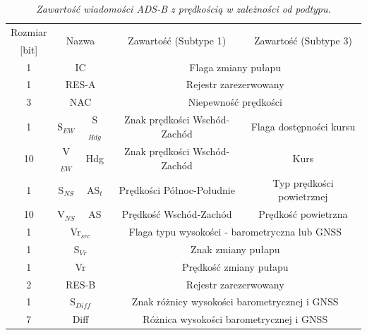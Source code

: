 \documentclass[eng,printmode]{mgr}
\begin{document}
\begin{table}[htb]
\def\arraystretch{1.3}%
\caption{\textit{ Zawartość wiadomości ADS-B z prędkością w zależności od podtypu.}}
\label{tab:adsb}
  \centering
  \def\arraystretch{1.2}%
  \begin{tabular}{|c|c|c|c|c|}
  \hline
  \multicolumn{1}{|c|}{Rozmiar} & \multicolumn{2}{c|}{\multirow{2}{*}{Nazwa}} & \multicolumn{1}{c|}{\multirow{2}{*}{Zawartość (Subtype 1)}}  & \multicolumn{1}{c|}{\multirow{2}{*}{Zawartość (Subtype 3)}}\\
  \multicolumn{1}{|c|}{[bit]} & \multicolumn{2}{c|}{} & \multicolumn{1}{c|}{}& \multicolumn{1}{c|}{}\\\cline{1-5}
  
  \multicolumn{1}{|c|}{1} & \multicolumn{2}{c|}{IC} & \multicolumn{2}{c|}{Flaga zmiany pułapu}\\\cline{1-5}
  \multicolumn{1}{|c|}{1} & \multicolumn{2}{c|}{RES-A} & \multicolumn{2}{c|}{Rejestr zarezerwowany}\\\cline{1-5}
  \multicolumn{1}{|c|}{3} & \multicolumn{2}{c|}{NAC} & \multicolumn{2}{c|}{Niepewność prędkości}\\\cline{1-5}
  \multicolumn{1}{|c|}{1} & \multicolumn{1}{c|}{S$_{EW}$} & \multicolumn{1}{c|}{S$_{Hdg}$} & \multicolumn{1}{c|}{Znak prędkości Wschód-Zachód} & \multicolumn{1}{c|}{Flaga dostępności kursu} \\\cline{1-5}
  \multicolumn{1}{|c|}{10} & \multicolumn{1}{c|}{V$_{EW}$} & \multicolumn{1}{c|}{Hdg} & \multicolumn{1}{c|}{Znak prędkości Wschód-Zachód}& \multicolumn{1}{c|}{Kurs}\\\cline{1-5}
  \multicolumn{1}{|c|}{1} & \multicolumn{1}{c|}{S$_{NS}$} & \multicolumn{1}{c|}{AS$_t$} & \multicolumn{1}{c|}{Prędkości Północ-Południe} & \multicolumn{1}{c|}{Typ prędkości powietrznej}\\\cline{1-5}
  \multicolumn{1}{|c|}{10} & \multicolumn{1}{c|}{V$_{NS}$} & \multicolumn{1}{c|}{AS}  & \multicolumn{1}{c|}{Prędkość Wschód-Zachód}& \multicolumn{1}{c|}{Prędkość powietrzna}\\\cline{1-5}
  \multicolumn{1}{|c|}{1} & \multicolumn{2}{c|}{Vr$_{src}$} & \multicolumn{2}{c|}{Flaga typu wysokości - barometryczna lub GNSS}\\\cline{1-5}
  \multicolumn{1}{|c|}{1} & \multicolumn{2}{c|}{S$_{Vr}$} & \multicolumn{2}{c|}{Znak zmiany pułapu}\\\cline{1-5}
  \multicolumn{1}{|c|}{1} & \multicolumn{2}{c|}{Vr} & \multicolumn{2}{c|}{Prędkość zmiany pułapu}\\\cline{1-5}
  \multicolumn{1}{|c|}{2} & \multicolumn{2}{c|}{RES-B} & \multicolumn{2}{c|}{Rejestr zarezerwowany}\\\cline{1-5}
  \multicolumn{1}{|c|}{1} & \multicolumn{2}{c|}{S$_{Diff}$} & \multicolumn{2}{c|}{Znak różnicy wysokości barometrycznej i GNSS}\\\cline{1-5}
  \multicolumn{1}{|c|}{7} & \multicolumn{2}{c|}{Diff} & \multicolumn{2}{c|}{Różnica wysokości barometrycznej i GNSS}\\\cline{1-5}
       
 \end{tabular}
\end{table}
\end{document}
